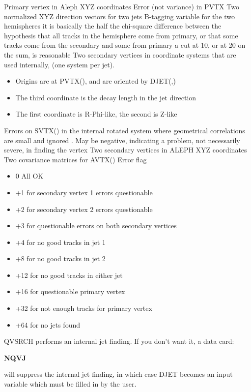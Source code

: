 \begin{indentlist}{ 3.50cm}{ 3.75cm}
  Primary vertex in Aleph XYZ coordinates
 Error (not variance) in PVTX
 Two normalized XYZ direction vectors for two jets
 B-tagging variable for the two hemispheres
      it is basically the half the chi-square difference between the
      hypothesis that all tracks in the hemisphere come from primary,
      or that some tracks come from the secondary and some from primary
      a cut at 10, or at 20 on the sum, is reasonable
 Two secondary vertices in coordinate systems
      that are used internally, (one system per jet).
\begin{itemize}
\item Origins are at PVTX(), and are oriented by DJET(,)
\item The third coordinate is the decay length in the jet direction
\item The first coordinate is R-Phi-like, the second is Z-like
\end{itemize}
Errors on SVTX() in the internal rotated system
      where geometrical correlations are small and ignored .
      May be negative, indicating a problem, not necessarily severe,
      in finding the vertex
Two secondary vertices in ALEPH XYZ coordinates
Two covariance matrices for AVTX()
Error flag
\begin{itemize}
\item 0 All OK
\item +1 for secondary vertex 1 errors questionable
\item +2 for secondary vertex 2 errors questionable
\item +3 for questionable errors on both secondary vertices
\item +4 for no good tracks in jet 1
\item +8 for no good tracks in jet 2
\item +12 for no good tracks in either jet
\item +16 for questionable primary vertex
\item +32 for not enough tracks for primary vertex
\item +64 for no jets found
\end{itemize}
\end{indentlist}
\par
    QVSRCH performs an internal jet finding. If you don't want it, a data card:
\par
 {\bf NQVJ}
\par
      will suppress the internal jet finding,
      in which case DJET becomes an input variable which must be filled in by
      the user.
\par
